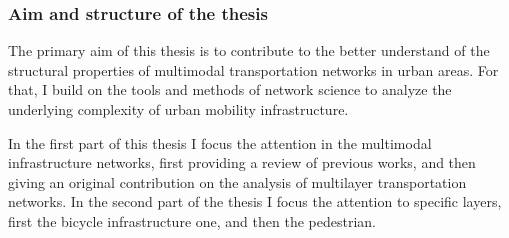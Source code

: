 





\subsubsection{Aim and structure of the thesis}
The primary aim of this thesis is to contribute to the better understand of the structural properties of multimodal transportation networks in urban areas. For that, I build on the tools and methods of network science to analyze the underlying complexity of urban mobility infrastructure. 

In the first part of this thesis I focus the attention in the multimodal infrastructure networks, first providing a review of previous works, and then giving an original contribution on the analysis of multilayer transportation networks. In the second part of the thesis I focus the attention to specific layers, first the bicycle infrastructure one, and then the pedestrian.

